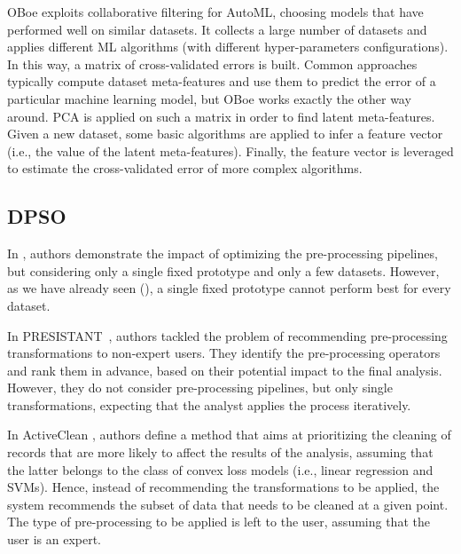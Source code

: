 OBoe \cite{yang2019oboe} exploits collaborative filtering for AutoML, choosing models that have performed well on similar datasets.
It collects a large number of datasets and applies different ML algorithms (with different hyper-parameters configurations). 
In this way, a matrix of cross-validated errors is built.
Common approaches typically compute dataset meta-features and use them to predict the error of a particular machine learning model, but OBoe works exactly the other way around.
PCA is applied on such a matrix in order to find latent meta-features.
Given a new dataset, some basic algorithms are applied to infer a feature vector (i.e., the value of the latent meta-features).
Finally, the feature vector is leveraged to estimate the cross-validated error of more complex algorithms.

\subsection{DPSO}
\label{effective-ssec:dpso}

In \cite{Quemy20InfSystems}, authors demonstrate the impact of optimizing the pre-processing pipelines, but considering only a single fixed prototype and only a few datasets.
However, as we have already seen (), a single fixed prototype cannot perform best for every dataset.

In PRESISTANT~\cite{presistant18CSI,presistant18CAISE,presistant19DKE}, authors tackled the problem of recommending pre-processing transformations to non-expert users.
They identify the pre-processing operators and rank them in advance, based on their potential impact to the final analysis.
However, they do not consider pre-processing pipelines, but only single transformations, expecting that the analyst applies the process iteratively.

In ActiveClean \cite{ActiveClean16PVLDB}, authors define a method that aims at prioritizing the cleaning of records that are more likely to affect the results of the analysis, assuming that the latter belongs to the class of convex loss models (i.e., linear regression and SVMs).
Hence, instead of recommending the transformations to be applied, the system recommends the subset of data that needs to be cleaned at a given point.
The type of pre-processing to be applied is left to the user, assuming that the user is an expert.

